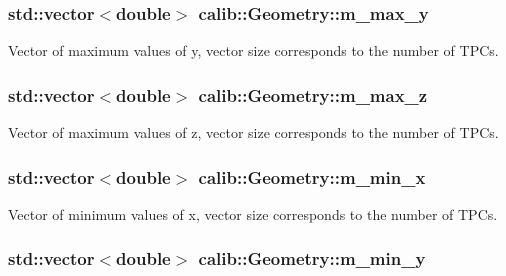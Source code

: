 \hypertarget{classcalib_1_1Geometry_ab5a15bf7344647c780bd212b2d0adf24}{
\subsubsection[{m\-\_\-max\-\_\-y}]{\setlength{\rightskip}{0pt plus 5cm}std\-::vector$<$double$>$ calib\-::\-Geometry\-::m\-\_\-max\-\_\-y\hspace{0.3cm}{\ttfamily [private]}}}\label{classcalib_1_1Geometry_ab5a15bf7344647c780bd212b2d0adf24}


Vector of maximum values of y, vector size corresponds to the number of T\-P\-Cs. 

\hypertarget{classcalib_1_1Geometry_a107c432e83c78151866ad2c0a3da246e}{
\subsubsection[{m\-\_\-max\-\_\-z}]{\setlength{\rightskip}{0pt plus 5cm}std\-::vector$<$double$>$ calib\-::\-Geometry\-::m\-\_\-max\-\_\-z\hspace{0.3cm}{\ttfamily [private]}}}\label{classcalib_1_1Geometry_a107c432e83c78151866ad2c0a3da246e}


Vector of maximum values of z, vector size corresponds to the number of T\-P\-Cs. 

\hypertarget{classcalib_1_1Geometry_a1708fea3fa3434776d6bfdd1c453a1ec}{
\subsubsection[{m\-\_\-min\-\_\-x}]{\setlength{\rightskip}{0pt plus 5cm}std\-::vector$<$double$>$ calib\-::\-Geometry\-::m\-\_\-min\-\_\-x\hspace{0.3cm}{\ttfamily [private]}}}\label{classcalib_1_1Geometry_a1708fea3fa3434776d6bfdd1c453a1ec}


Vector of minimum values of x, vector size corresponds to the number of T\-P\-Cs. 

\hypertarget{classcalib_1_1Geometry_adb4cc41aa504cbff34d567ad117fa834}{
\subsubsection[{m\-\_\-min\-\_\-y}]{\setlength{\rightskip}{0pt plus 5cm}std\-::vector$<$double$>$ calib\-::\-Geometry\-::m\-\_\-min\-\_\-y\hspace{0.3cm}{\ttfamily [private]}}}\label{classcalib_1_1Geometry_adb4cc41aa504cbff34d567ad117fa834}


